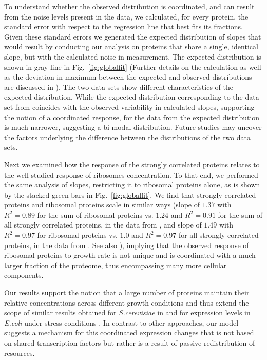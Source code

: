 \documentclass[10pt,letterpaper]{article}
\newcommand{\hGlobalSumSlope}{$1.24$}
\newcommand{\hGlobalSumRsq}{0.91}
\newcommand{\hRibsSumSlope}{$1.37$}
\newcommand{\hRibsSumRsq}{0.89}
\newcommand{\vnGlobalSumSlope}{$1.0$}
\newcommand{\vGlobalSumSlope}{\vnGlobalSumSlope{}}
\newcommand{\vnGlobalSumRsq}{0.97}
\newcommand{\vGlobalSumRsq}{\vnGlobalSumRsq{}}
\newcommand{\vnRibsSumSlope}{$1.49$}
\newcommand{\vRibsSumSlope}{\vnRibsSumSlope{}}
\newcommand{\vnRibsSumRsq}{0.97}
\newcommand{\vRibsSumRsq}{\vnRibsSumRsq{}}
\begin{document}
To understand whether the observed distribution is coordinated, and can result from the noise levels present in the data, we calculated, for every protein, the standard error with respect to the regression line that best fits its fractions.
Given these standard errors we generated the expected distribution of slopes that would result by conducting our analysis on proteins that share a single, identical slope, but with the calculated noise in measurement.
The expected distribution is shown in gray line in Fig.~\ref{fig:globalfit} (Further details on the calculation as well as the deviation in maximum between the expected and observed distributions are discussed in ).
The two data sets show different characteristics of the expected distribution.
While the expected distribution corresponding to the data set from \cite{Schmidt2015} coincides with the observed variability in calculated slopes, supporting the notion of a coordinated response, for the data from \cite{Peebo_2015} the expected distribution is much narrower, suggesting a bi-modal distribution.
Future studies may uncover the factors underlying the difference between the distributions of the two data sets.

Next we examined how the response of the strongly correlated proteins relates to the well-studied response of ribosomes concentration.
To that end, we performed the same analysis of slopes, restricting it to ribosomal proteins alone, as is shown by the stacked green bars in Fig.~\ref{fig:globalfit}.
We find that strongly correlated proteins and ribosomal proteins scale in similar ways (slope of \hRibsSumSlope{} with $R^2=\hRibsSumRsq{}$ for the sum of ribosomal proteins vs. \hGlobalSumSlope{} and $R^2=\hGlobalSumRsq$ for the sum of all strongly correlated proteins, in the data from \cite{Schmidt2015}, and slope of \vRibsSumSlope{} with $R^2=\vRibsSumRsq{}$ for ribosomal proteins vs. \vGlobalSumSlope{} and $R^2=\vGlobalSumRsq{}$ for all strongly correlated proteins, in the data from \cite{Peebo_2015}. See also ), implying that the observed response of ribosomal proteins to growth rate is not unique and is coordinated with a much larger fraction of the proteome, thus encompassing many more cellular components.

Our results support the notion that a large number of proteins maintain their relative concentrations across different growth conditions and thus extend the scope of similar results obtained for \emph{S.cerevisiae} in \cite{Keren2013} and for expression levels in \emph{E.coli} under stress conditions \cite{Kaneko2014}.
In contrast to other approaches, our model suggests a mechanism for this coordinated expression changes that is not based on shared transcription factors but rather is a result of passive redistribution of resources.
\end{document}
